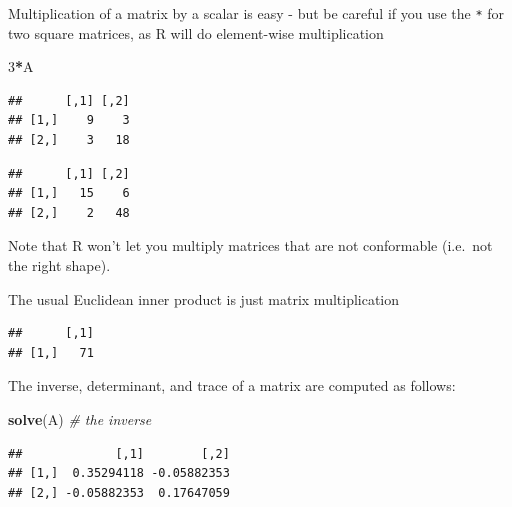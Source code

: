 \documentclass[]{book}
\newenvironment{Shaded}{\begin{snugshade}}{\end{snugshade}}
\newcommand{\CommentTok}[1]{\textcolor[rgb]{0.56,0.35,0.01}{\textit{#1}}}
\newcommand{\DecValTok}[1]{\textcolor[rgb]{0.00,0.00,0.81}{#1}}
\newcommand{\KeywordTok}[1]{\textcolor[rgb]{0.13,0.29,0.53}{\textbf{#1}}}
\newcommand{\NormalTok}[1]{#1}
\newcommand{\OperatorTok}[1]{\textcolor[rgb]{0.81,0.36,0.00}{\textbf{#1}}}
\newcommand{\StringTok}[1]{\textcolor[rgb]{0.31,0.60,0.02}{#1}}
\theoremstyle{definition}
\theoremstyle{definition}
\theoremstyle{definition}
\theoremstyle{remark}
\begin{document}
Multiplication of a matrix by a scalar is easy - but be careful if you use the \texttt{*} for two square matrices, as R will do element-wise multiplication

\begin{Shaded}
\begin{Highlighting}[]
\DecValTok{3}\OperatorTok{*}\NormalTok{A}
\end{Highlighting}
\end{Shaded}

\begin{verbatim}
##      [,1] [,2]
## [1,]    9    3
## [2,]    3   18
\end{verbatim}

\begin{Shaded}
\end{Shaded}

\begin{verbatim}
##      [,1] [,2]
## [1,]   15    6
## [2,]    2   48
\end{verbatim}

Note that R won't let you multiply matrices that are not conformable (i.e.~not the right shape).

The usual Euclidean inner product is just matrix multiplication

\begin{Shaded}
\end{Shaded}

\begin{verbatim}
##      [,1]
## [1,]   71
\end{verbatim}

The inverse, determinant, and trace of a matrix are computed as follows:

\begin{Shaded}
\begin{Highlighting}[]
\KeywordTok{solve}\NormalTok{(A) }\CommentTok{# the inverse}
\end{Highlighting}
\end{Shaded}

\begin{verbatim}
##             [,1]        [,2]
## [1,]  0.35294118 -0.05882353
## [2,] -0.05882353  0.17647059
\end{verbatim}
\end{document}
